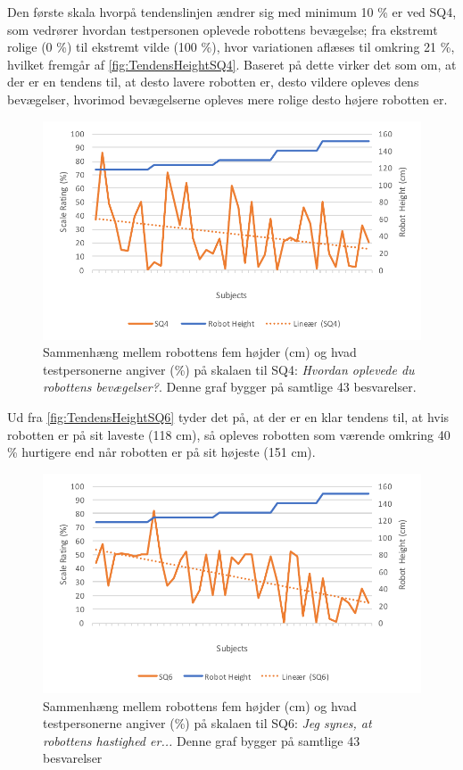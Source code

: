 Den første skala hvorpå tendenslinjen ændrer sig med minimum 10 \% er ved SQ4, som vedrører hvordan testpersonen oplevede robottens bevægelse; fra ekstremt rolige (0 \%) til ekstremt vilde (100 \%), hvor variationen aflæses til omkring 21 \%, hvilket fremgår af \autoref{fig:TendensHeightSQ4}. Baseret på dette virker det som om, at der er en tendens til, at desto lavere robotten er, desto vildere opleves dens bevægelser, hvorimod bevægelserne opleves mere rolige desto højere robotten er. 
%
\begin{figure}[H]
\centering
\includegraphics[width=\textwidth]{Figure/DatabehandlingSkalaer/TendensHeight/HeightSQ4}
\caption{Sammenhæng mellem robottens fem højder (cm) og hvad testpersonerne angiver (\%) på skalaen til SQ4: \textit{Hvordan oplevede du robottens bevægelser?}. Denne graf bygger på samtlige 43 besvarelser.}
\label{fig:TendensHeightSQ4}
\end{figure}
\noindent
%
Ud fra \autoref{fig:TendensHeightSQ6} tyder det på, at der er en klar tendens til, at hvis robotten er på sit laveste (118 cm), så opleves robotten som værende omkring 40 \% hurtigere end når robotten er på sit højeste (151 cm).
%
\begin{figure}[H]
\centering
\includegraphics[width=\textwidth]{Figure/DatabehandlingSkalaer/TendensHeight/HeightSQ6}
\caption{Sammenhæng mellem robottens fem højder (cm) og hvad testpersonerne angiver (\%) på skalaen til SQ6: \textit{Jeg synes, at robottens hastighed er...} Denne graf bygger på samtlige 43 besvarelser}
\label{fig:TendensHeightSQ6}
\end{figure}
